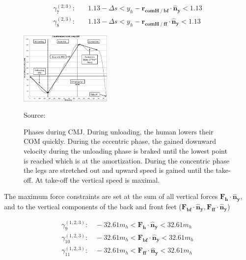 \documentclass[default,iicol]{sn-jnl}
\begin{document}
\begin{equation}
\begin{split}
        \gamma_{7}^{(2,3)}:& \quad  1.13-\Delta s < y_h - \mathbf{r_{comH \mathbin{/} bf}} \cdot \mathbf{\hat n_y} < 1.13 \\ 
      \gamma_{8}^{(2,3)}:& \quad  1.13-\Delta s < y_h - \mathbf{r_{comH \mathbin{/} ff}} \cdot \mathbf{\hat n_y} < 1.13 
      \end{split}
\end{equation}

\begin{figure}
    \centering
    \includegraphics[width=0.4\textwidth]{figure/countermovementjumpRFD.jpg}
    \caption[Ground reaction force of CMJ]{Phases during CMJ. During unloading, the human lowers their COM quickly. During the eccentric phase, the gained downward velocity during the unloading phase is braked until the lowest point is reached which is at the amortization. During the concentric phase the legs are stretched out and upward speed is gained until the take-off. At take-off the vertical speed is maximal.}
    \centering \footnotesize Source: \cite{barker_relationships_2018}%
    \label{f_cmj}
\end{figure}

\noindent The maximum force constraints are set at the sum of all vertical forces $\mathbf{F_h}\cdot \mathbf{\hat n_y}$, and to the vertical components of the back and front feet ($\mathbf{F_{bf}}\cdot \mathbf{\hat n_y}, \mathbf{F_{ff}}\cdot \mathbf{\hat n_y}$)

\begin{equation}
\begin{array}{c}
    \gamma_{9}^{(1,2,3)}:\quad  -32.61 m_h < \mathbf{F_h}\cdot \mathbf{\hat n_y} < 32.61 m_h   \\
    \gamma_{10}^{(1,2,3)}:\quad  -32.61 m_h < \mathbf{F_{bf}}\cdot \mathbf{\hat n_y} < 32.61 m_h \\
    \gamma_{11}^{(1,2,3)}:\quad  -32.61 m_h < \mathbf{F_{ff}}\cdot \mathbf{\hat n_y} < 32.61 m_h \\
\end{array}
\end{equation}
\end{document}
